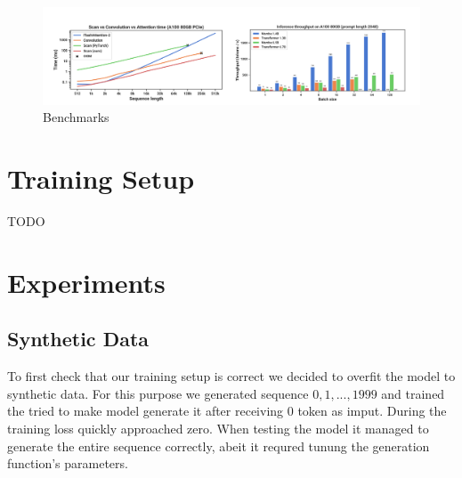\documentclass[conference,compsoc]{IEEEtran}
\begin{document}
\begin{table}[t] \centering
    \caption{Model comparison \cite{mamba}}
    \label{tab:comparison}

\end{table}

\begin{figure}[!htbp]
    \centering \includegraphics[width=\linewidth]{../assets/results.png}
    \caption{Benchmarks \cite{mamba}}
    \label{fig:mamba}
\end{figure}

\section{Training Setup}
TODO
\section{Experiments}
\subsection{Synthetic Data}
To first check that our training setup is correct we decided to overfit the model to synthetic data. For this purpose we generated sequence $0, 1, ..., 1999$ and trained the tried to make model generate it after receiving 0 token as imput. During the training loss  quickly approached zero. When testing the model it managed to generate the entire sequence correctly, abeit it requred tunung the generation function's parameters.
\end{document}
